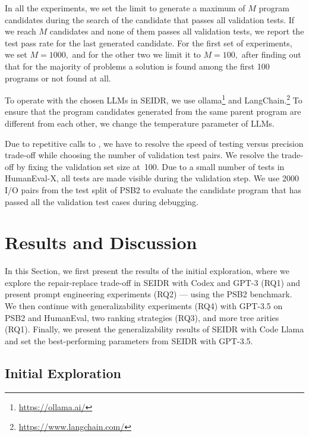 In all the experiments, we set the limit to generate a maximum of $M$ program candidates during the search of the candidate that passes all validation tests. 
If we reach $M$ candidates and none of them passes all validation tests, we report the test pass rate for the last generated candidate. 
For the first set of experiments, we set $M = 1000,$ and for the other two we limit it to $M = 100,$ after finding out that for the majority of problems a solution is found among the first 100 programs or not found at all.

To operate with the chosen LLMs in SEIDR, we use ollama\footnote{\url{https://ollama.ai/}} and LangChain.\footnote{\url{https://www.langchain.com/}}  
To ensure that the program candidates generated from the same parent program are different from each other, we change the temperature parameter of LLMs. 

Due to repetitive calls to \execute{}, we have to resolve the speed of testing versus precision trade-off while choosing the number of validation test pairs.
We resolve the trade-off by fixing the validation set size at~100. Due to a small number of tests in HumanEval-X, all tests are made visible during the validation step. 
We use 2000 I/O pairs from the test split of PSB2 to evaluate the candidate program that has passed all the validation test cases during debugging. 

 
\newpage
\section{Results and Discussion}
\label{sec:seidr-results}

In this Section, we first present the results of the initial exploration, where we explore the repair-replace trade-off in SEIDR with Codex and GPT-3 (RQ1) and present prompt engineering experiments (RQ2) --- using the PSB2 benchmark.
We then continue with generalizability experiments (RQ4) with GPT-3.5 on PSB2 and HumanEval, two ranking strategies (RQ3), and more tree arities (RQ1). 
Finally, we present the generalizability results of SEIDR with Code Llama and set the best-performing parameters from SEIDR with GPT-3.5.

\newpage \subsection{Initial Exploration}

